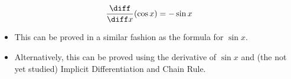 \begin{frame}
\begin{theorem}
\[
\frac{\diff}{\diff x} (\cos x ) = -\sin x
\]
\end{theorem}
\begin{itemize}
\item This can be proved in a similar fashion as the formula for $\sin x$.
\item Alternatively, this can be proved using the derivative of $\sin x$ and (the not yet studied) Implicit Differentiation and Chain Rule.
\end{itemize}
\end{frame}
